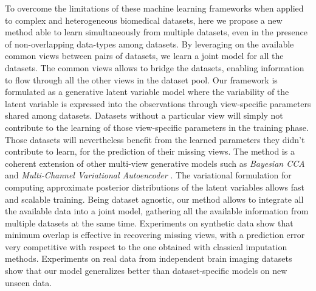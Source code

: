 To overcome the limitations of these machine learning frameworks when applied to complex and heterogeneous biomedical datasets, here we propose a new method able to learn simultaneously from multiple datasets, even in the presence of non-overlapping data-types among datasets.
By leveraging on the available common views between pairs of datasets, we learn a joint model for all the datasets.
The common views allows to bridge the datasets, enabling information to flow through all the other views in the dataset pool.
Our framework is formulated as a generative latent variable model where the variability of the latent variable is expressed into the observations through view-specific parameters shared among datasets.
Datasets without a particular view will simply not contribute to the learning of those view-specific parameters in the training phase.
Those datasets will nevertheless benefit from the learned parameters they didn't contribute to learn, for the prediction of their missing views.
The method is a coherent extension of other multi-view generative models such as \textit{Bayesian CCA} \citep{ Klami2013} and \textit{Multi-Channel Variational Autoencoder} \citep{Antelmi2019}.
The variational formulation for computing approximate posterior distributions of the latent variables allows fast and scalable training.
Being dataset agnostic, our method allows to integrate all the available data into a joint model, gathering  all the available information from multiple datasets at the same time.
Experiments on synthetic data show that minimum overlap is effective in recovering missing views, with a prediction error very competitive with respect to the one obtained with classical imputation methods.
Experiments on real data from independent brain imaging datasets show that our model generalizes better than dataset-specific models on new unseen data.

